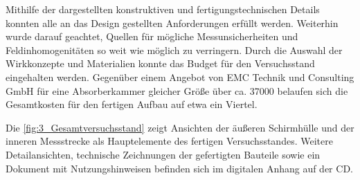 Mithilfe der dargestellten konstruktiven und fertigungstechnischen Details konnten alle an das Design gestellten Anforderungen erfüllt werden. Weiterhin wurde darauf geachtet, Quellen für mögliche Messunsicherheiten und Feldinhomogenitäten so weit wie möglich zu verringern. Durch die Auswahl der Wirkkonzepte und Materialien konnte das Budget für den Versuchsstand eingehalten werden. Gegenüber einem Angebot von EMC Technik und Consulting GmbH für eine Absorberkammer gleicher Größe über ca. \SI{37000}{\text{\euro}} belaufen sich die Gesamtkosten für den fertigen Aufbau auf etwa ein Viertel. 
\par
\vspace{\linespace}
Die \Abb\ref{fig:3_Gesamtversuchsstand} zeigt Ansichten der äußeren Schirmhülle und der inneren Messstrecke als Haupt\-elemente des fertigen Versuchsstandes. Weitere Detailansichten, technische Zeichnungen der gefertigten Bauteile sowie ein Dokument mit Nutzungshinweisen befinden sich im digitalen Anhang auf der CD.
\par
\vspace{\linespace}

